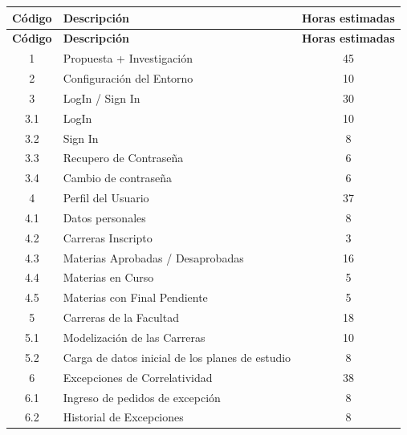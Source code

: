 \documentclass[a4paper]{article}
\begin{document}
\begin{longtable}{| c | l | c |}

\hline
\textbf{Código}		& 	\textbf{Descripción}											& 	\textbf{Horas estimadas} \\
\hline \hline
\endfirsthead

\hline
\textbf{Código}		& 	\textbf{Descripción}											& 	\textbf{Horas estimadas} \\
\hline \hline
\endhead

\endfoot

\endlastfoot


1					&	Propuesta + Investigación 										&	45\\
\hline
2					&	Configuración del Entorno 										&	10\\
\hline
3					&	LogIn / Sign In			 										&	30\\
\hline
3.1					&	LogIn					 										&	10\\
\hline		
3.2					&	Sign In					 										&	8\\
\hline
3.3					&	Recupero de Contraseña											&	6\\
\hline
3.4					&	Cambio de contraseña											&	6\\
\hline	
4					&	Perfil del Usuario												&	37\\
\hline
4.1					&	Datos personales												&	8\\
\hline
4.2					&	Carreras Inscripto												&	3\\
\hline
4.3					&	Materias Aprobadas / Desaprobadas								&	16\\
\hline
4.4					&	Materias en Curso												&	5\\
\hline
4.5					&	Materias con Final Pendiente									&	5\\
\hline
5					&	Carreras de la Facultad											&	18\\
\hline
5.1					&	Modelización de las Carreras									&	10\\
\hline
5.2					&	Carga de datos inicial de los planes de estudio				&	8\\
\hline
6					&	Excepciones de Correlatividad									&	38\\
\hline
6.1					&	Ingreso de pedidos de excepción								&	8\\
\hline
6.2					&	Historial de Excepciones										&	8\\

\end{longtable}
\end{document}

